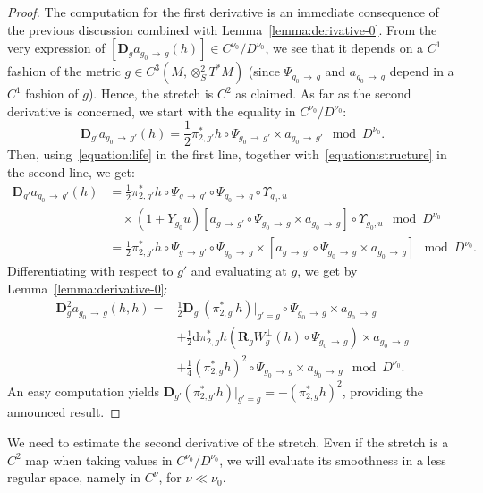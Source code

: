 \documentclass[10pt]{amsart}
\theoremstyle{definition}\newtheorem{defi}[theo]{Definition}\newtheorem{rema}[theo]{Remark}\newtheorem{exam}[theo]{Example}\newtheorem{exem}[theo]{Example}\newtheorem{nota}[theo]{Notation}
\newcommand{\RR}{\mathbf{R}}
\newcommand{\bdD}{\mathbf{D}}
\newcommand{\dd}{\mathrm{d}}
\begin{document}
\begin{proof}
The computation for the first derivative is an immediate consequence of the previous discussion combined with Lemma~\ref{lemma:derivative-0}. From the very expression of $[\bdD_g a_{g_0\,\to \,g} (h)] \in C^{\nu_0}/D^{\nu_0}$, we see that it depends on a $C^1$ fashion of the metric $g \in C^3(M,\otimes^2_S T^*M)$ (since $\Psi_{g_0 \,\to\,g}$ and $a_{g_0\,\to\,g}$ depend in a $C^1$ fashion of $g$). Hence, the stretch is $C^2$ as claimed. As far as the second derivative is concerned, we start with the equality in $C^{\nu_0}/D^{\nu_0}$:
\[
\bdD_{g'} a_{g_0\,\to\,g'} (h) = \frac{1}{2}\pi_{2,g'}^\ast h \circ \Psi_{g_0\,\to\,g'} \times a_{g_0\,\to\,g'} \mod D^{\nu_0}.
\]
Then, using~\eqref{equation:life} in the first line, together with~\eqref{equation:structure} in the second line, we get:
\begin{align*}
\bdD_{g'} a_{g_0\,\to\,g'} (h) 
&= \frac{1}{2}\pi_{2,g'}^\ast h \circ \Psi_{g\,\to\,g'} \circ \Psi_{g_0\,\to\,g}\circ \Upsilon_{g_0,u}\\
&\quad \times \left(1 + Y_{g_0} u\right) \left[a_{g\,\to\,g'} \circ \Psi_{g_0\,\to\,g} \times a_{g_0\,\to\,g}\right] \circ \Upsilon_{g_0,u} \mod D^{\nu_0} \\
& = \frac{1}{2}\pi_{2,g'}^\ast h \circ \Psi_{g\,\to\,g'} \circ \Psi_{g_0\,\to\,g} \times \left[a_{g\,\to\,g'} \circ \Psi_{g_0\,\to\,g} \times a_{g_0\,\to\,g}\right] \mod D^{\nu_0}.
\end{align*}
Differentiating with respect to $g'$ and evaluating at $g$, we get by Lemma~\ref{lemma:derivative-0}:
\begin{align*}
\bdD^2_{g} a_{g_0\,\to\,g}(h,h)
 =& \frac{1}{2} \bdD_{g'}\left(\pi_{2,g'}^\ast h\right)|_{g'=g} \circ \Psi_{g_0\,\to\,g} \times a_{g_0 \,\to\,g}\\
& + \frac{1}{2} \dd \pi_{2,g}^\ast h\left(\RR_g W^\bot_g(h) \circ \Psi_{g_0\,\to\,g} \right) \times a_{g_0\,\to\,g} \\
& + \frac{1}{4} \left(\pi_{2,g}^\ast h\right)^2 \circ \Psi_{g_0\,\to\,g} \times a_{g_0\,\to\,g} \mod D^{\nu_0}.
\end{align*}
An easy computation yields $\bdD_{g'}(\pi_{2,g'}^\ast h)|_{g'=g} = -(\pi_{2,g}^\ast h)^2$, providing the announced result.
\end{proof}


We need to estimate the second derivative of the stretch. Even if the stretch is a $C^2$ map when taking values in $C^{\nu_0}/D^{\nu_0}$, we will evaluate its smoothness in a less regular space, namely in $C^{\nu}$, for $\nu \ll \nu_0$.
\end{document}
